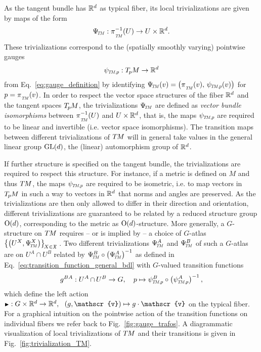 As the tangent bundle has $\mathbb{R}^d$ as typical fiber, its local trivializations are given by maps of the form
\begin{align}\label{eq:trivialization_TM}
    {\PsiTM: \piTM^{-1}\!\left(U\right) \to U\times\R^d} .
\end{align}
These trivializations correspond to the (spatially smoothly varying) pointwise gauges
\begin{align}\label{eq:def_psiTMp}
    \psiTMp: \TpM \to \R^d
\end{align}
from Eq.~\eqref{eq:gauge_definition} by identifying $\PsiTM(v) = \left(\piTM(v),\, \psiTMp(v) \right)$ for $p=\piTM(v)$.
In order to respect the vector space structures of the fiber $\mathbb{R}^d$ and the tangent spaces $T_{\mkern-1.5mu p}\mkern-.5muM$, the trivializations $\PsiTM$ are defined as \emph{vector bundle isomorphisms} between $\piTM^{-1}(U)$ and $U\times\mathbb{R}^d$, that is, the maps $\psiTMp$ are required to be linear and invertible (i.e. vector space isomorphisms).
The transition maps between different trivializations of $T\mkern-1.5muM$ will in general take values in the general linear group $\operatorname{GL}(d)$, the (linear) automorphism group of $\mathbb{R}^d$.


If further structure is specified on the tangent bundle, the trivializations are required to respect this structure.
For instance, if a metric is defined on $M$ and thus $T\mkern-1.5muM$, the maps $\psiTMp$ are required to be isometric, i.e. to map vectors in $T_{\mkern-1.5mu p}\mkern-.5muM$ in such a way to vectors in $\mathbb{R}^d$ that norms and angles are preserved.
As the trivializations are then only allowed to differ in their direction and orientation, different trivializations are guaranteed to be related by a reduced structure group $\operatorname{O}(d)$, corresponding to the metric as $\operatorname{O}(d)$-structure.
More generally, a $G$-structure on $T\mkern-1.5muM$ requires -- or is implied by -- a choice of $G$-atlas $\big\{ \big(U^X, \PsiTM^X \big) \big\}_{\!X\in\mathfrak{X}}\,$.
Two different trivializations $\PsiTM^A$ and $\PsiTM^B$ of such a $G$-atlas are on $U^A\cap U^B$ related by ${\PsiTM^B\circ\big(\PsiTM^A\big)^{-1}}$ as defined in Eq.~\eqref{eq:transition_function_general_bdl} with $G$-valued transition functions
\begin{align}\label{eq:transition_fct_TM_gAB}
    g^{BA}: U^A\mkern-1mu \cap\mkern-1mu U^B \to G,\ \ \ p \mapsto \psiTMp^B\circ \big(\psiTMp^A\big)^{-1} \,,
\end{align}
which define the left action $\btr: G\times \R^d \to \R^d,\ \ (g,\mathscr{v}) \mapsto g\cdot \mathscr{v}$ on the typical fiber.
For a graphical intuition on the pointwise action of the transition functions on individual fibers we refer back to Fig.~\ref{fig:gauge_trafos}.
A diagrammatic visualization of local trivializations of $T\mkern-1.5muM$ and their transitions is given in Fig.~\ref{fig:trivialization_TM}.

